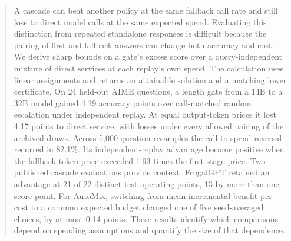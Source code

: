 \begin{abstract}
A cascade can beat another policy at the same fallback call rate and still lose to direct model calls at the same expected spend. Evaluating this distinction from repeated standalone responses is difficult because the pairing of first and fallback answers can change both accuracy and cost. We derive sharp bounds on a gate's excess score over a query-independent mixture of direct services at each replay's own spend. The calculation uses linear assignments and returns an attainable solution and a matching lower certificate. On 24 held-out AIME questions, a length gate from a 14B to a 32B model gained 4.19 accuracy points over call-matched random escalation under independent replay. At equal output-token prices it lost 4.17 points to direct service, with losses under every allowed pairing of the archived draws. Across 5,000 question resamples the call-to-spend reversal recurred in 82.1\%. Its independent-replay advantage became positive when the fallback token price exceeded 1.93 times the first-stage price. Two published cascade evaluations provide context. FrugalGPT retained an advantage at 21 of 22 distinct test operating points, 13 by more than one score point. For AutoMix, switching from mean incremental benefit per cost to a common expected budget changed one of five seed-averaged choices, by at most 0.14 points. These results identify which comparisons depend on spending assumptions and quantify the size of that dependence.
\end{abstract}

